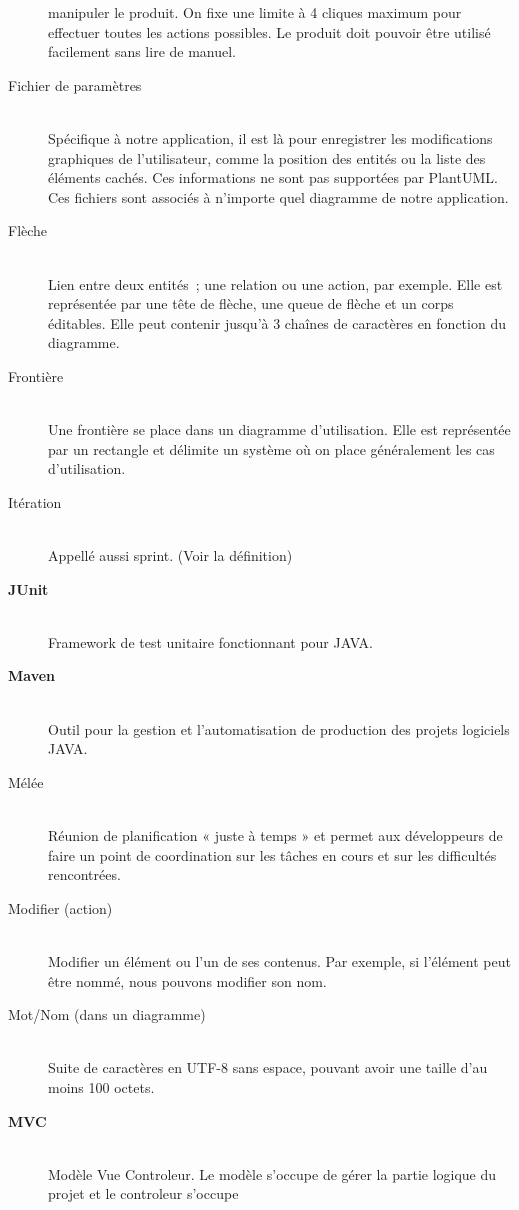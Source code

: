 \documentclass[hidelinks, 10pt,a4paper]{article}
\begin{document}
\begin{description}
	  manipuler le produit. On fixe une limite à 4 cliques maximum pour effectuer toutes les actions possibles.
	  Le produit doit pouvoir être utilisé facilement sans lire de manuel.
   \item[Fichier de paramètres]~\\ Spécifique à notre application, il est là pour enregistrer les modifications graphiques de l’utilisateur, comme la position des 
	  entités ou la liste des éléments cachés. Ces informations ne sont pas supportées par PlantUML. Ces fichiers sont associés à 
	  n’importe quel diagramme de notre application.
  \item[Flèche]~\\ Lien entre deux entités~; une relation ou une action, par exemple. Elle est représentée par une tête de flèche, une queue de flèche et un corps 
    éditables. Elle peut contenir jusqu’à 3 chaînes de caractères en fonction du diagramme.
  \item[Frontière]~\\ Une frontière se place dans un diagramme d’utilisation. Elle est représentée par un rectangle et délimite un système où on place généralement les cas 
    d’utilisation.
  \item[Itération]~\\ Appellé aussi sprint. (Voir la définition)
    \item[\textbf{JUnit}]~\\ Framework de test unitaire fonctionnant pour JAVA.
    \item[\textbf{Maven}]~\\ Outil pour la gestion et l'automatisation de production des projets logiciels JAVA.
    \item[Mélée]~\\ Réunion de planification « juste à temps » et permet aux développeurs de faire un point de coordination sur 
		    les tâches en cours et sur les difficultés rencontrées.
   \item[Modifier (action)]~\\ Modifier un élément ou l’un de ses contenus. Par exemple, si l’élément peut être nommé, nous pouvons modifier son nom.
   \item[Mot/Nom (dans un diagramme)]~\\ Suite de caractères en UTF-8 sans espace, pouvant avoir une taille d’au moins 100 octets.
    \item[\textbf{MVC}]~\\ Modèle Vue Controleur. Le modèle s'occupe de gérer la partie logique du projet et le controleur s'occupe

\end{description}
\end{document}
